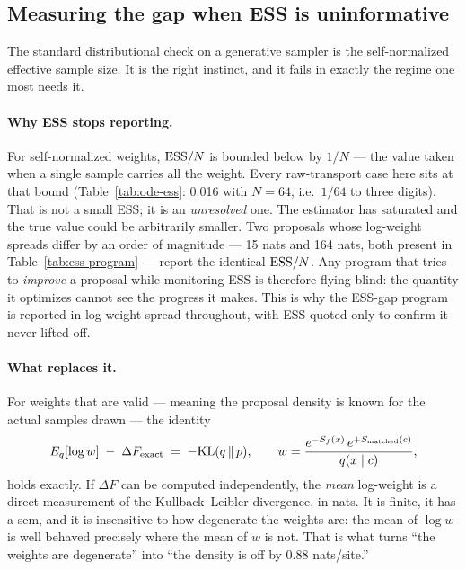 \subsection{Measuring the gap when ESS is uninformative}
\label{sec:appendix-v2-measuring}

The standard distributional check on a generative sampler is the
self-normalized effective sample size. It is the right instinct, and it fails
in exactly the regime one most needs it.

\paragraph{Why ESS stops reporting.} For self-normalized weights, ${\rm
ESS}/N$ is bounded below by $1/N$ --- the value taken when a single sample
carries all the weight. Every raw-transport case here sits at that bound
(Table~\ref{tab:ode-ess}: 0.016 with $N = 64$, i.e.\ $1/64$ to three digits).
That is not a small ESS; it is an \emph{unresolved} one. The estimator has
saturated and the true value could be arbitrarily smaller. Two proposals
whose log-weight spreads differ by an order of magnitude --- 15 nats and 164
nats, both present in Table~\ref{tab:ess-program} --- report the identical
${\rm ESS}/N$. Any program that tries to \emph{improve} a proposal while
monitoring ESS is therefore flying blind: the quantity it optimizes cannot
see the progress it makes. This is why the ESS-gap program is reported in
log-weight spread throughout, with ESS quoted only to confirm it never lifted
off.

\paragraph{What replaces it.} For weights that are valid --- meaning the
proposal density is known for the actual samples drawn --- the identity
\begin{equation}
  E_q[\log w] \;-\; \Delta F_{\rm exact} \;=\; -{\rm KL}(q \,\|\, p),
  \qquad
  w = \frac{e^{-S_f(x)}\, e^{+S_{\rm matched}(c)}}{q(x \mid c)},
\end{equation}
holds exactly. If $\Delta F$ can be computed independently, the \emph{mean}
log-weight is a direct measurement of the Kullback--Leibler divergence, in
nats. It is finite, it has a sem, and it is insensitive to how degenerate the
weights are: the mean of $\log w$ is well behaved precisely where the mean of
$w$ is not. That is what turns ``the weights are degenerate'' into ``the
density is off by 0.88 nats/site.''


